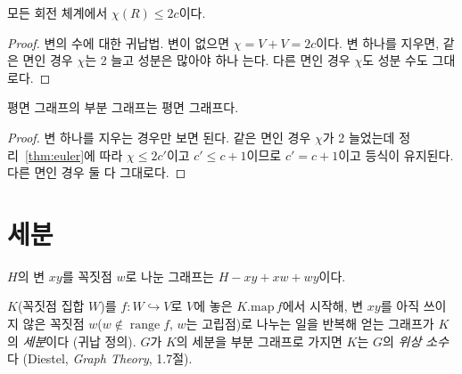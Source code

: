 \begin{theorem}
\label{thm:euler}
\leanok
{}
모든 회전 체계에서 \(\chi(R) \le 2c\)이다.
\end{theorem}

\begin{proof}
\leanok
{}
변의 수에 대한 귀납법. 변이 없으면 \(\chi = V + V = 2c\)이다. 변 하나를 지우면, 같은 면인 경우
\(\chi\)는 2 늘고 성분은 많아야 하나 는다. 다른 면인 경우 \(\chi\)도 성분 수도 그대로다.
\end{proof}

\begin{theorem}[부분 그래프]
\label{thm:mono}
\leanok
{}
평면 그래프의 부분 그래프는 평면 그래프다.
\end{theorem}

\begin{proof}
\leanok
{}
변 하나를 지우는 경우만 보면 된다. 같은 면인 경우 \(\chi\)가 2 늘었는데 정리~\ref{thm:euler}에 따라
\(\chi \le 2c'\)이고 \(c' \le c + 1\)이므로 \(c' = c + 1\)이고 등식이 유지된다. 다른 면인 경우 둘 다 그대로다.
\end{proof}

\section{세분}

\begin{definition}[변 세분하기]
\label{def:subdivideEdge}
\leanok
\(H\)의 변 \(xy\)를 꼭짓점 \(w\)로 나눈 그래프는 \(H - xy + xw + wy\)이다.
\end{definition}

\begin{definition}[세분, 위상 소수]
\label{def:subdiv}
\leanok
{}
\(K\)(꼭짓점 집합 \(W\))를 \(f : W \hookrightarrow V\)로 \(V\)에 놓은 \(K.\mathrm{map}\,f\)에서 시작해,
변 \(xy\)를 아직 쓰이지 않은 꼭짓점 \(w\)(\(w \notin \operatorname{range} f\), \(w\)는 고립점)로
나누는 일을 반복해 얻는 그래프가 \(K\)의 \emph{세분}이다 (귀납 정의). \(G\)가 \(K\)의 세분을 부분
그래프로 가지면 \(K\)는 \(G\)의 \emph{위상 소수}다 (Diestel, \emph{Graph Theory}, 1.7절).
\end{definition}

